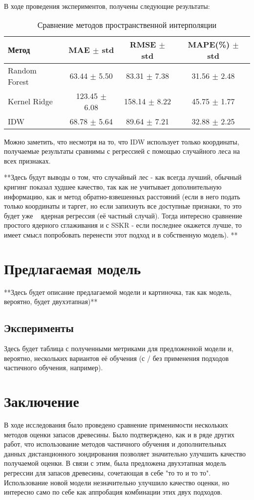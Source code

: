 \documentclass{article}
\begin{document}
В ходе проведения экспериментов, получены следующие результаты:
\begin{table}[h]
   \centering
   \begin{tabular}{|l|c|c|c|}
       \hline
       Метод & MAE $\pm$ std & RMSE $\pm$ std & MAPE(\%) $\pm$ std \\
       \hline
       Random Forest & 63.44 $\pm$ 5.50 & 83.31 $\pm$ 7.38 & 31.56 $\pm$ 2.48 \\
       Kernel Ridge & 123.45 $\pm$ 6.08 & 158.14 $\pm$ 8.22 & 45.75 $\pm$ 1.77 \\
       IDW & 68.78 $\pm$ 5.64 & 89.64 $\pm$ 7.21 & 32.88 $\pm$ 2.25 \\
       \hline
   \end{tabular}
   \caption{Сравнение методов пространственной интерполяции}
   \label{tab:methods_comparison}
\end{table}
Можно заметить, что несмотря на то, что IDW использует только координаты, получаемые результаты сравнимы с регрессией с помощью случайного леса на всех признаках.

**Здесь будут выводы о том, что случайный лес - как всегда лучший, обычный кригинг показал худшее качество, так как не учитывает дополнительную информацию, как и метод обратно-взвешенных расстояний (если в него подать только координаты и таргет, но если запихнуть все доступные признаки, то это будет уже ~ ядерная регрессия (её частный случай). Тогда интересно сравнение простого ядерного сглаживания и с SSKR - если последнее окажется лучше, то имеет смысл попробовать перенести этот подход и в собственную модель). **

\section{Предлагаемая модель}
**Здесь будет описание предлагаемой модели и картиночка, так как модель, вероятно, будет двухэтапная)**

\subsection{Эксперименты}
Здесь будет таблица с полученными метриками для предложенной модели и, вероятно, нескольких вариантов её обучения (с / без применения подходов частичного обучения, например).

\section*{Заключение}
В ходе исследования было проведено сравнение применимости нескольких методов оценки запасов древесины. Было подтверждено, как и в ряде других работ, что использование методов частичного обучения и дополнительных данных дистанционного зондирования позволяет значительно улучшить качество получаемой оценки. В связи с этим, была предложена двухэтапная модель регрессии для запасов древесины, сочетающая в себе "то то и то то". Использование новой модели незначительно улучшило качество оценки, но интересно само по себе как аппробация комбинации этих двух подходов. 
\end{document}
